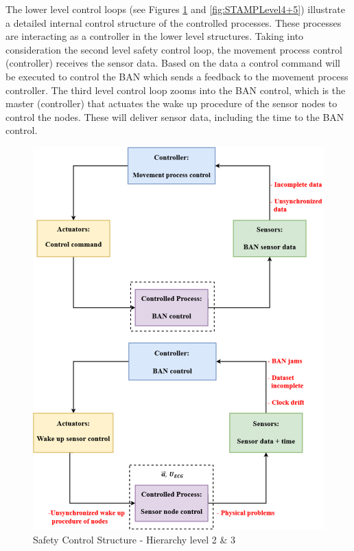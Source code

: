 \documentclass[10pt,journal,compsoc]{IEEEtran}
\begin{document}
	The lower level control loops (see Figures \ref{fig:STAMPLevel2+3} and \ref{fig:STAMPLevel4+5}) illustrate a detailed internal control structure of the controlled processes. These processes are interacting as a controller in the lower level structures. Taking into consideration the second level safety control loop, the movement process control (controller) receives the sensor data. Based on the data a control command will be executed to control the BAN which sends a feedback to the movement process controller. The third level control loop zooms into the BAN control, which is the master (controller) that actuates the wake up procedure of the sensor nodes to control the nodes. These will deliver sensor data, including the time to the BAN control.
	\begin{figure}[!ht]
		\centering
		\includegraphics[scale=0.37]{Images/STAMP2+3level(3).eps}
		\caption[Safety Control Structure - Hierarchy level 2 \& 3]{Safety Control Structure - Hierarchy level 2 \& 3}
		\label{fig:STAMPLevel2+3}
	\end{figure} 
\end{document}
